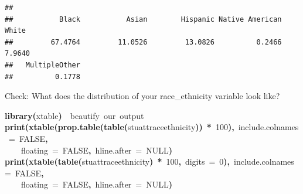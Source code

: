 \documentclass[12pt]{article}
\makeatletter
\newcommand{\hlnumber}[1]{\textcolor[rgb]{0,0,0}{#1}}%
\newcommand{\hlfunctioncall}[1]{\textcolor[rgb]{0.501960784313725,0,0.329411764705882}{\textbf{#1}}}%
\newcommand{\hlkeyword}[1]{\textcolor[rgb]{0,0,0}{\textbf{#1}}}%
\newcommand{\hlargument}[1]{\textcolor[rgb]{0.690196078431373,0.250980392156863,0.0196078431372549}{#1}}%
\newcommand{\hlcomment}[1]{\textcolor[rgb]{0.180392156862745,0.6,0.341176470588235}{#1}}%
\newcommand{\hlsymbol}[1]{\textcolor[rgb]{0,0,0}{#1}}%
\newcommand{\hlstd}[1]{\textcolor[rgb]{0,0,0}{#1}}%
\newenvironment{kframe}{%
 \def\FrameCommand##1{\hskip\@totalleftmargin \hskip-\fboxsep
 \colorbox{shadecolor}{##1}\hskip-\fboxsep
     \hskip-\linewidth \hskip-\@totalleftmargin \hskip\columnwidth}%
 \MakeFramed {\advance\hsize-\width
   \@totalleftmargin\z@ \linewidth\hsize
   \@setminipage}}%
 {\par\unskip\endMakeFramed}
\newenvironment{knitrout}{}{} %
\makeatother
\begin{document}
\begin{knitrout}
\begin{kframe}
\begin{flushleft}
\normalfont
\end{flushleft}
\begin{verbatim}
## 
##           Black           Asian        Hispanic Native American           White 
##         67.4764         11.0526         13.0826          0.2466          7.9640 
##   MultipleOther 
##          0.1778 
\end{verbatim}
\end{kframe}
\end{knitrout}


Check:  What does the distribution of your race\_ethnicity variable look like?

\begin{knitrout}
\color{fgcolor}\begin{kframe}
\begin{flushleft}
\ttfamily\noindent
\hlfunctioncall{library}\hlkeyword{(}\hlsymbol{xtable}\hlkeyword{)}{\ }{\ }\hlcomment{\usebox{\hlnormalsizeboxhash}beautify{\ }our{\ }output}\hspace*{\fill}\\
\hlstd{}\hlfunctioncall{print}\hlkeyword{(}\hlfunctioncall{xtable}\hlkeyword{(}\hlfunctioncall{prop.table}\hlkeyword{(}\hlfunctioncall{table}\hlkeyword{(}\hlsymbol{stuatt}\hlkeyword{\usebox{\hlnormalsizeboxdollar}}\hlsymbol{race\usebox{\hlnormalsizeboxunderscore}ethnicity}\hlkeyword{)}\hlkeyword{)}{\ }\hlkeyword{*}{\ }\hlnumber{100}\hlkeyword{)}\hlkeyword{,}{\ }\hlargument{include.colnames}{\ }\hlargument{=}{\ }\hlnumber{FALSE}\hlkeyword{,}\hspace*{\fill}\\
\hlstd{}{\ }{\ }{\ }{\ }\hlargument{floating}{\ }\hlargument{=}{\ }\hlnumber{FALSE}\hlkeyword{,}{\ }\hlargument{hline.after}{\ }\hlargument{=}{\ }NULL\hlkeyword{)}\hspace*{\fill}\\
\hlstd{}\hlfunctioncall{print}\hlkeyword{(}\hlfunctioncall{xtable}\hlkeyword{(}\hlfunctioncall{table}\hlkeyword{(}\hlsymbol{stuatt}\hlkeyword{\usebox{\hlnormalsizeboxdollar}}\hlsymbol{race\usebox{\hlnormalsizeboxunderscore}ethnicity}\hlkeyword{)}{\ }\hlkeyword{*}{\ }\hlnumber{100}\hlkeyword{,}{\ }\hlargument{digits}{\ }\hlargument{=}{\ }\hlnumber{0}\hlkeyword{)}\hlkeyword{,}{\ }\hlargument{include.colnames}{\ }\hlargument{=}{\ }\hlnumber{FALSE}\hlkeyword{,}\hspace*{\fill}\\
\hlstd{}{\ }{\ }{\ }{\ }\hlargument{floating}{\ }\hlargument{=}{\ }\hlnumber{FALSE}\hlkeyword{,}{\ }\hlargument{hline.after}{\ }\hlargument{=}{\ }NULL\hlkeyword{)}\mbox{}
\normalfont
\end{flushleft}
\end{kframe}
\end{knitrout}
\end{document}
